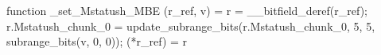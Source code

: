 function _set_Mstatush_MBE (r_ref, v) = {
    r = __bitfield_deref(r_ref);
    r.Mstatush_chunk_0 = update_subrange_bits(r.Mstatush_chunk_0, 5, 5, subrange_bits(v, 0, 0));
    (*r_ref) = r
}
